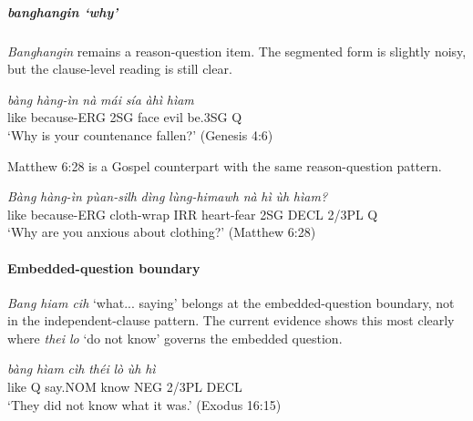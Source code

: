 \documentclass[
  11pt,
  a4paper,
]{article}
\newcommand{\tdim}[1]{\textit{#1}}
\newcommand{\tdimword}[1]{\textit{#1}}
\renewcommand{\textsc}[1]{{\footnotesize\MakeUppercase{#1}}}
\newcommand{\glossquote}[1]{`#1'}
\begin{document}
\subparagraph{\texorpdfstring{\tdim{banghangin}
\glossquote{why}}{ }}\label{section-3}

\tdim{Banghangin} remains a reason-question item. The segmented form is
slightly noisy, but the clause-level reading is still clear.

\begin{exe}
\ex \label{ex:int-banghangin-gen4-6}
\gll \tdimword{bàng} \tdimword{hàng-ìn} \tdimword{nà} \tdimword{mái} \tdimword{sía} \tdimword{àhì} \tdimword{hìam} \\
     like because-\textsc{erg} \textsc{2sg} face evil be.\textsc{3sg} \textsc{q} \\
\glt \glossquote{Why is your countenance fallen?} (Genesis 4:6)
\end{exe}

Matthew 6:28 is a Gospel counterpart with the same reason-question
pattern.

\begin{exe}
\ex \label{ex:int-banghangin-matt6-28}
\gll \tdimword{Bàng} \tdimword{hàng-ìn} \tdimword{pùan-silh} \tdimword{dìng} \tdimword{lùng-himawh} \tdimword{nà} \tdimword{hì} \tdimword{ùh} \tdimword{hìam?} \\
     like because-\textsc{erg} cloth-wrap \textsc{irr} heart-fear \textsc{2sg} \textsc{decl} 2/3PL \textsc{q} \\
\glt \glossquote{Why are you anxious about clothing?} (Matthew 6:28)
\end{exe}

\paragraph{Embedded-question boundary}\label{embedded-question-boundary}

\tdim{Bang hiam cih} \glossquote{what... saying} belongs at the
embedded-question boundary, not in the independent-clause pattern. The
current evidence shows this most clearly where \tdim{thei lo}
\glossquote{do not know} governs the embedded question.

\begin{exe}
\ex \label{ex:int-embedded-exod16-15}
\gll \tdimword{bàng} \tdimword{hìam} \tdimword{cìh} \tdimword{théi} \tdimword{lò} \tdimword{ùh} \tdimword{hì} \\
     like \textsc{q} say.\textsc{nom} know \textsc{neg} 2/3PL \textsc{decl} \\
\glt \glossquote{They did not know what it was.} (Exodus 16:15)
\end{exe}
\end{document}
